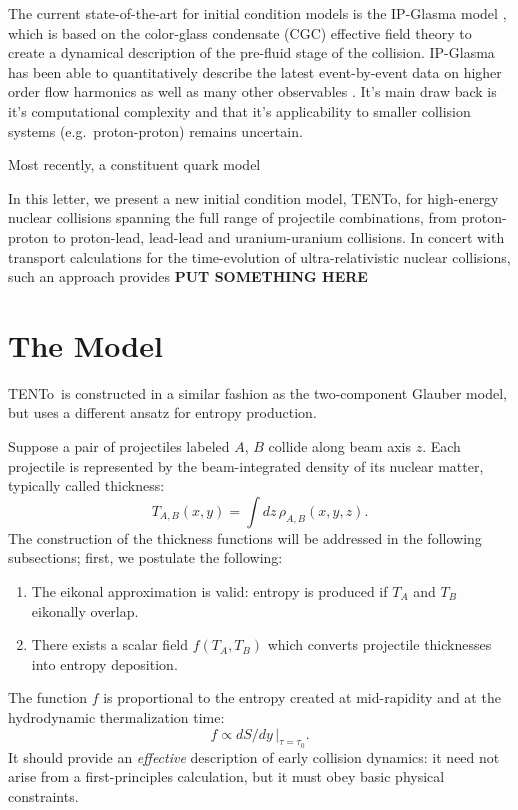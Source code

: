 \documentclass[aps,prl,reprint,amsmath,nofootinbib]{revtex4-1}
\newcommand{\trento}{T\raisebox{-.5ex}{R}ENTo}
\begin{document}
The current state-of-the-art for initial condition models is the IP-Glasma model \cite{}, which is based on the color-glass condensate (CGC) effective 
field theory \cite{} to create a dynamical description of the pre-fluid stage of the collision.  IP-Glasma has been able to quantitatively describe the 
latest event-by-event data on higher order flow harmonics as well as many other observables \cite{Schenke:2014zha}. It's main draw back is it's computational 
complexity and that it's applicability to smaller collision systems (e.g.~proton-proton) remains uncertain.

Most recently, a constituent quark model

In this letter, we present a new initial condition model, \trento, for high-energy nuclear collisions spanning the full range of projectile combinations, 
from proton-proton to proton-lead, lead-lead and uranium-uranium collisions. In concert with transport calculations for the time-evolution of ultra-relativistic 
nuclear collisions, such an approach provides {\bf PUT SOMETHING HERE} %

\section{The Model}

\trento\ is constructed in a similar fashion as the two-component Glauber model, but uses a different ansatz
for entropy production. 

Suppose a pair of projectiles labeled $A$, $B$ collide along beam axis $z$.  Each projectile is represented by
the beam-integrated density of its nuclear matter, typically called thickness:
\begin{equation}
  T_{A,B}(x, y) = \int dz \, \rho_{A,B}(x, y, z).
\end{equation}
The construction of the thickness functions will be addressed in the following subsections; first, we
postulate the following:
\begin{enumerate}
  \item The eikonal approximation is valid:  entropy is produced if $T_A$ and $T_B$ eikonally overlap.
  \item There exists a scalar field $f(T_A, T_B)$ which converts projectile thicknesses into entropy
    deposition.
\end{enumerate}
The function $f$ is proportional to the entropy created at mid-rapidity and at the hydrodynamic thermalization
time:
\begin{equation}
  f \propto dS/dy \, |_{\tau = \tau_0}.
\end{equation}
It should provide an \emph{effective} description of early collision dynamics:  it need not arise from a
first-principles calculation, but it must obey basic physical constraints.
\end{document}
